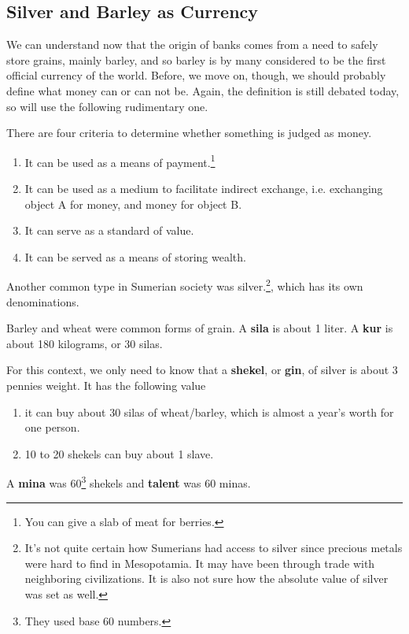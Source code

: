 \documentclass{article}
\begin{document}
  \subsection{Silver and Barley as Currency}

    We can understand now that the origin of banks comes from a need to safely store grains, mainly barley, and so barley is by many considered to be the first official currency of the world. Before, we move on, though, we should probably define what money can or can not be. Again, the definition is still debated today, so will use the following rudimentary one.

    \begin{definition}[Money]
      There are four criteria to determine whether something is judged as money. 
      \begin{enumerate}
        \item It can be used as a means of payment.\footnote{You can give a slab of meat for berries. } 
        \item It can be used as a medium to facilitate indirect exchange, i.e. exchanging object A for money, and money for object B. 
        \item It can serve as a standard of value. 
        \item It can be served as a means of storing wealth. 
      \end{enumerate}
    \end{definition}

    Another common type in Sumerian society was silver.\footnote{It's not quite certain how Sumerians had access to silver since precious metals were hard to find in Mesopotamia. It may have been through trade with neighboring civilizations. It is also not sure how the absolute value of silver was set as well. }, which has its own denominations. 

    \begin{definition} 
      Barley and wheat were common forms of grain. A \textbf{sila} is about 1 liter. A \textbf{kur} is about 180 kilograms, or 30 silas.
    \end{definition}

    \begin{definition}
      For this context, we only need to know that a \textbf{shekel}, or \textbf{gin}, of silver is about 3 pennies weight. It has the following value 
      \begin{enumerate}
        \item it can buy about 30 silas of wheat/barley, which is almost a year's worth for one person. 
        \item 10 to 20 shekels can buy about 1 slave. 
      \end{enumerate}
      A \textbf{mina} was 60\footnote{They used base 60 numbers.} shekels and \textbf{talent} was 60 minas. 
    \end{definition}
\end{document}
